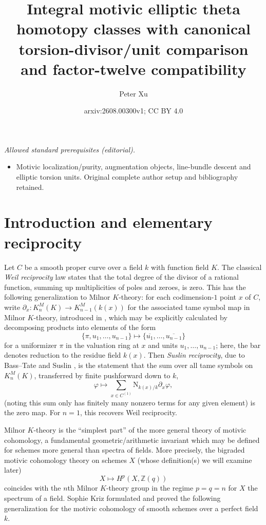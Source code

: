 \documentclass[a4paper,reqno,11pt]{amsart}
\title{Integral motivic elliptic theta homotopy classes with canonical torsion-divisor/unit comparison and factor-twelve compatibility}
\author{Peter Xu}
\date{arxiv:2608.00300v1; CC BY 4.0}
\theoremstyle{plain}
\theoremstyle{definition}
\theoremstyle{remark}
\newcommand{\Z}{\mathbb{Z}}
\begin{document}
\maketitle
\noindent\textit{Allowed standard prerequisites (editorial).}\begin{itemize}
\item Motivic localization/purity, augmentation objects, line-bundle descent and elliptic torsion units. Original complete author setup and bibliography retained.
\end{itemize}\medskip
\section{Introduction and elementary reciprocity}

Let $C$ be a smooth proper curve over a field $k$ with function field $K$. The classical \emph{Weil reciprocity} law states that the total degree of the divisor of a rational function, summing up multiplicities of poles and zeroes, is zero. This has the following generalization to Milnor $K$-theory: for each codimension-$1$ point $x$ of $C$, write $\partial_x: K_n^M(K) \to K_{n-1}^M(k(x))$ for the associated tame symbol map in Milnor $K$-theory, introduced in \cite{Mil}, which may be explicitly calculated by decomposing products into elements of the form
\begin{equation} \label{eq:cup}
\{\pi, u_1, \ldots, u_{n-1} \} \mapsto \{\overline{u_1},\ldots, \overline{u_{n-1}}\}
\end{equation}
for a uniformizer $\pi$ in the valuation ring at $x$ and units $u_1,\ldots, u_{n-1}$; here, the bar denotes reduction to the residue field $k(x)$. Then \emph{Suslin reciprocity}, due to Bass--Tate \cite{BaTa} and Suslin \cite{Sus}, is the statement that the sum over all tame symbols on $K_n^M(K)$, transferred by finite pushforward down to $k$,
\begin{equation} \label{eq:suslin}
\varphi\mapsto \sum_{x\in C^{(1)}} \mathrm{N}_{k(x)/k}\partial_x \varphi,
\end{equation}
(noting this sum only has finitely many nonzero terms for any given element) is the zero map. For $n=1$, this recovers Weil reciprocity. 

Milnor $K$-theory is the ``simplest part'' of the more general theory of motivic cohomology, a fundamental geometric/arithmetic invariant which may be defined for schemes more general than spectra of fields. More precisely, the bigraded motivic cohomology theory on schemes $X$ (whose definition(s) we will examine later)
\[
X\mapsto H^p(X, \Z(q))
\]
coincides with the $n$th Milnor $K$-theory group in the regime $p=q=n$ for $X$ the spectrum of a field. Sophie Kriz \cite{Kr} formulated and proved the following generalization for the motivic cohomology of smooth schemes over a perfect field $k$.
\end{document}

